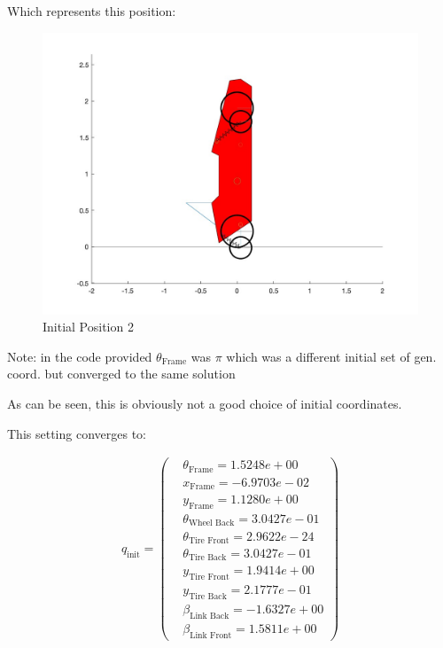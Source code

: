 Which represents this position:


\begin{figure}[ht]
    \centering
    \includegraphics[scale=0.235]{images/q_init_2.jpg}
    \caption{Initial Position 2}
    \label{fig:init_2}
\end{figure}
\noindent Note: in the code provided $\theta_{\text{Frame}}$ was $\pi$ which was a different initial set of gen. coord. but converged to the same solution\\
\vspace{2mm}

\noindent As can be seen, this is obviously not a good choice of initial coordinates.

This setting converges to:

\begin{equation}\label{eq:4.5.4}
    \begin{split}
        q_{\text{init}} = 
        \begin{pmatrix}
            &\theta_{\text{Frame}} = 1.5248e+00\\
            &x_{\text{Frame}} = -6.9703e-02\\
            &y_{\text{Frame}} = 1.1280e+00\\
            &\theta_{\text{Wheel Back}} = 3.0427e-01\\
            &\theta_{\text{Tire Front}} = 2.9622e-24\\
            &\theta_{\text{Tire Back}} = 3.0427e-01\\
            &y_{\text{Tire Front}} = 1.9414e+00\\
            &y_{\text{Tire Back}} = 2.1777e-01\\
            &\beta_{\text{Link Back}} = -1.6327e+00\\
            &\beta_{\text{Link Front}} = 1.5811e+00
        \end{pmatrix}
    \end{split}
\end{equation}

